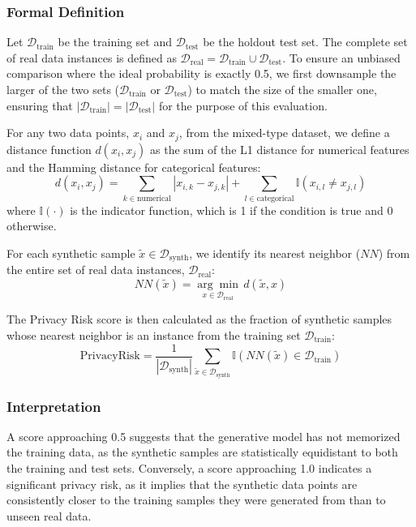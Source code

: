 \subsubsection{Formal Definition}
Let $\mathcal{D}_{\text{train}}$ be the training set and $\mathcal{D}_{\text{test}}$ be the holdout test set. The complete set of real data instances is defined as $\mathcal{D}_{\text{real}} = \mathcal{D}_{\text{train}} \cup \mathcal{D}_{\text{test}}$. To ensure an unbiased comparison where the ideal probability is exactly 0.5, we first downsample the larger of the two sets ($\mathcal{D}_{\text{train}}$ or $\mathcal{D}_{\text{test}}$) to match the size of the smaller one, ensuring that $|\mathcal{D}_{\text{train}}| = |\mathcal{D}_{\text{test}}|$ for the purpose of this evaluation.

For any two data points, $x_i$ and $x_j$, from the mixed-type dataset, we define a distance function $d(x_i, x_j)$ as the sum of the L1 distance for numerical features and the Hamming distance for categorical features:
\begin{equation}
    d(x_i, x_j) = \sum_{k \in \text{numerical}} |x_{i,k} - x_{j,k}| + \sum_{l \in \text{categorical}} \mathbb{I}(x_{i,l} \neq x_{j,l})
\end{equation}
where $\mathbb{I}(\cdot)$ is the indicator function, which is 1 if the condition is true and 0 otherwise.

For each synthetic sample $\tilde{x} \in \mathcal{D}_{\text{synth}}$, we identify its nearest neighbor ($NN$) from the entire set of real data instances, $\mathcal{D}_{\text{real}}$:
\begin{equation}
    NN(\tilde{x}) = \underset{x \in \mathcal{D}_{\text{real}}}{\arg\min} \, d(\tilde{x}, x)
\end{equation}

The Privacy Risk score is then calculated as the fraction of synthetic samples whose nearest neighbor is an instance from the training set $\mathcal{D}_{\text{train}}$:
\begin{equation}
    \text{PrivacyRisk} = \frac{1}{|\mathcal{D}_{\text{synth}}|} \sum_{\tilde{x} \in \mathcal{D}_{\text{synth}}} \mathbb{I}(NN(\tilde{x}) \in \mathcal{D}_{\text{train}})
\end{equation}

\subsubsection{Interpretation}
A score approaching 0.5 suggests that the generative model has not memorized the training data, as the synthetic samples are statistically equidistant to both the training and test sets. Conversely, a score approaching 1.0 indicates a significant privacy risk, as it implies that the synthetic data points are consistently closer to the training samples they were generated from than to unseen real data.

